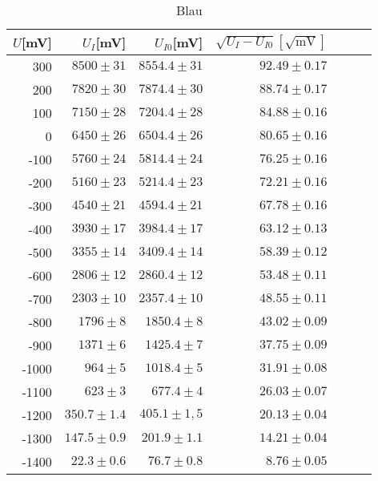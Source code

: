 \begin{table}[h!]
  \centering
  \caption{Blau}
    \begin{tabular}{r r r r r r r}
    \toprule
    $U$[mV] & $U_I$[mV] & $U_{I0}$[mV] & $\sqrt{U_I  - U_{I0}}[\sqrt{\text{mV}}]$\\
    \midrule
    300   & $8500 \pm  31$ &$ 8554.4 \pm 31$ & $92.49 \pm 0.17$ \\
    200   & $7820 \pm 30$ & $7874.4 \pm 30$ &$ 88.74  \pm0.17$ \\
    100   & $7150 \pm28$ &$ 7204.4 \pm 28$ & $84.88 \pm0.16$\\
    0     & $6450 \pm 26$ & $6504.4 \pm 26$ & $80.65  \pm0.16$ \\
    -100  & $5760 \pm 24$ & $5814.4 \pm 24$ & $76.25 \pm 0.16$ \\
    -200  & $5160 \pm 23$ & $5214.4 \pm 23$ & $72.21 \pm 0.16$\\
    -300  & $4540 \pm 21$ & $4594.4 \pm 21$ & $67.78 \pm 0.16$ \\
    -400  & $3930 \pm 17$ & $3984.4 \pm 17$ & $63.12 \pm0.13$ \\
    -500  & $3355 \pm 14$ & $3409.4 \pm 14$ & $58.39 \pm0.12$ \\
    -600  & $2806 \pm 12$ & $2860.4 \pm 12$ & $53.48 \pm 0.11$ \\
    -700  & $2303 \pm 10$ & $2357.4 \pm 10$ &$ 48.55 \pm 0.11$ \\
    -800  &$ 1796 \pm 8$& $1850.4 \pm 8$ &$ 43.02  \pm0.09$ \\
    -900  & $1371\pm 6 $& $1425.4 \pm 7$ & $37.75  \pm0.09$ \\
    -1000 & $964 \pm 5$ & $1018.4 \pm 5 $& $31.91 \pm 0.08$ \\
    -1100 & $623 \pm 3$ & $677.4 \pm 4$ & $26.03 \pm0.07$\\
    -1200 & $350.7  \pm1.4$ & $405.1 \pm 1,5$ &$ 20.13 \pm 0.04$ \\
    -1300 & $147.5 \pm 0.9$ & $201.9 \pm 1.1$& $14.21 \pm0.04$ \\
    -1400 & $22.3  \pm 0.6$ & $76.7  \pm 0.8$ & $8.76 \pm 0.05$ \\
    \end{tabular}%
  \label{tab:addlabel}%
\end{table}%

